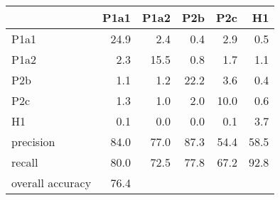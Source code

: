 \begin{tabular}{lrrrrr}
\toprule
{} &  P1a1 &  P1a2 &  P2b &  P2c &   H1 \\
\midrule
P1a1             &  24.9 &   2.4 &  0.4 &  2.9 &  0.5 \\
P1a2             &   2.3 &  15.5 &  0.8 &  1.7 &  1.1 \\
P2b              &   1.1 &   1.2 & 22.2 &  3.6 &  0.4 \\
P2c              &   1.3 &   1.0 &  2.0 & 10.0 &  0.6 \\
H1               &   0.1 &   0.0 &  0.0 &  0.1 &  3.7 \\
precision        &  84.0 &  77.0 & 87.3 & 54.4 & 58.5 \\
recall           &  80.0 &  72.5 & 77.8 & 67.2 & 92.8 \\
overall accuracy &  76.4 &       &      &      &      \\
\bottomrule
\end{tabular}
